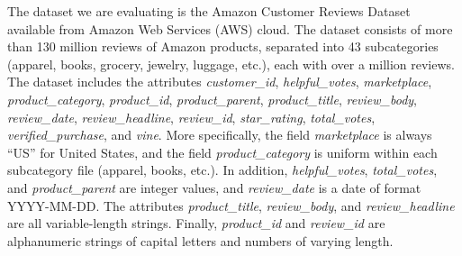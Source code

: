\documentclass[10pt, conference, compsocconf]{IEEEtran}
\begin{document}
The dataset we are evaluating is the Amazon Customer Reviews Dataset \cite{aws} available from Amazon Web Services (AWS) cloud. The dataset consists of more than 130 million reviews of Amazon products, separated into 43 subcategories (apparel, books, grocery, jewelry, luggage, etc.), each with over a million reviews. The dataset includes the attributes \textit{customer\_id}, \textit{helpful\_votes}, \textit{marketplace}, \textit{product\_category}, \textit{product\_id}, \textit{product\_parent}, \textit{product\_title}, \textit{review\_body}, \textit{review\_date}, \textit{review\_headline}, \textit{review\_id}, \textit{star\_rating}, \textit{total\_votes}, \textit{verified\_purchase}, and \textit{vine}. More specifically, the field \textit{marketplace} is always “US” for United States, and the field \textit{product\_category} is uniform within each subcategory file (apparel, books, etc.). In addition, \textit{helpful\_votes}, \textit{total\_votes}, and \textit{product\_parent} are integer values, and \textit{review\_date} is a date of format YYYY-MM-DD. The attributes \textit{product\_title}, \textit{review\_body}, and \textit{review\_headline} are all variable-length strings. Finally, \textit{product\_id} and \textit{review\_id} are alphanumeric strings of capital letters and numbers of varying length.
\end{document}
